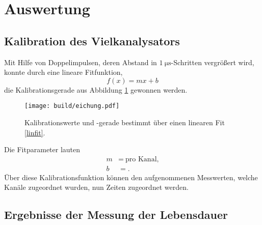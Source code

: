 \section{Auswertung}
\label{sec:Auswertung}

\subsection{Kalibration des Vielkanalysators}

Mit Hilfe von Doppelimpulsen, deren Abstand in $\SI{1}{\micro\second}$-Schritten vergrößert wird, konnte durch eine lineare Fitfunktion,
\begin{equation}
  f(x) = mx + b \label{linfit}
\end{equation}
die Kalibrationsgerade aus Abbildung \ref{plot:kali} gewonnen werden.
\begin{figure}
  \centering
  \texttt{[image: build/eichung.pdf]}
  \caption{Kalibrationswerte und -gerade bestimmt über einen linearen Fit \ref{linfit}.}
  \label{plot:kali}
\end{figure}
Die Fitparameter lauten
\begin{align*}
  m &=  \: \text{pro Kanal,}\\
  b &= .
\end{align*}
Über diese Kalibrationsfunktion können den aufgenommenen Messwerten, welche Kanäle zugeordnet wurden, nun Zeiten zugeordnet werden.

\subsection{Ergebnisse der Messung der Lebensdauer}

